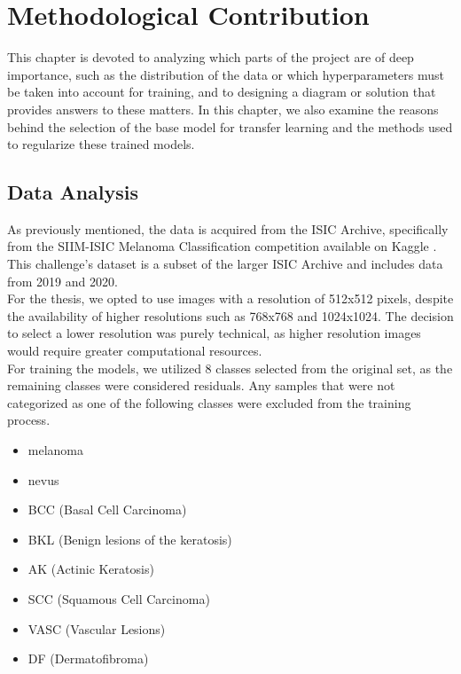 \chapter{Methodological Contribution}
\label{cap:contrib}

This chapter is devoted to analyzing which parts of the project are of deep importance, such as the distribution of the data or which hyperparameters must be taken into account for training, and to designing a diagram or solution that provides answers to these matters. In this chapter, we also examine the reasons behind the selection of the base model for transfer learning and the methods used to regularize these trained models.

\section{Data Analysis}
\label{sec:data-analysis}

As previously mentioned, the data is acquired from the ISIC Archive, specifically from the SIIM-ISIC Melanoma Classification competition available on Kaggle \cite{ISICKaggle}. This challenge's dataset is a subset of the larger ISIC Archive and includes data from 2019 and 2020. \\

For the thesis, we opted to use images with a resolution of 512x512 pixels, despite the availability of higher resolutions such as 768x768 and 1024x1024. The decision to select a lower resolution was purely technical, as higher resolution images would require greater computational resources. \\

For training the models, we utilized 8 classes selected from the original set, as the remaining classes were considered residuals. Any samples that were not categorized as one of the following classes were excluded from the training process. \\

\begin{itemize}
    \item melanoma
    \item nevus 
    \item BCC (Basal Cell Carcinoma)
    \item BKL (Benign lesions of the keratosis)
    \item AK (Actinic Keratosis)
    \item SCC (Squamous Cell Carcinoma)
    \item VASC (Vascular Lesions)
    \item DF (Dermatofibroma)
\end{itemize}

